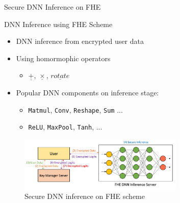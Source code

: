 \documentclass[9pt]{beamer}
\begin{document}
\begin{frame}{Secure DNN Inference on FHE}
    \begin{block}{DNN Inference using FHE Scheme}
        \begin{itemize}
            \item DNN inference from encrypted user data
            \item Using homormophic operators
                  \begin{itemize}
                      \item $\underline{+}$, $\underline{\times}$, $\underline{rotate}$
                  \end{itemize}
            \item Popular DNN components on inference stage:
                  \begin{itemize}
                      \item \texttt{Matmul}, \texttt{Conv}, \texttt{Reshape}, \texttt{Sum} ...
                      \item \texttt{ReLU}, \texttt{MaxPool}, \texttt{Tanh}, ...
                  \end{itemize}
        \end{itemize}
    \end{block}
    \begin{figure}[!h]
        \centering
        \includegraphics[width=0.7\textwidth]{resource/secure_dnn_inference.png}
        \caption{Secure DNN inference on FHE scheme}
        \label{fig:secure_dnn_inference}
    \end{figure}
\end{frame}
\end{document}
